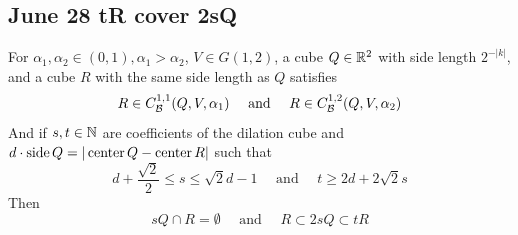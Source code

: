 \subsection{June 28 tR cover 2sQ}
\begin{lemma}
    For $\alpha_1, \alpha_2\in(0,1), \alpha_1>\alpha_2$, $V\in G(1,2)$, a cube $Q\in \mathbb{R}^2$ with side length $2^{-|k|}$, and a cube $R$ with the same side length as $Q$ satisfies
    \begin{equation}\label{eq:condition-GDBC-2}
        R\in C_\mathcal B^{1,1}(Q, V, \alpha_1) \quad\text{ and }\quad R\in  C_\mathcal B^{1,2}(Q, V, \alpha_2)
    \end{equation}
    And if $s, t\in \mathbb{N}$ are coefficients of the dilation cube and $d\cdot\operatorname{side} Q=|\operatorname{center} Q-\operatorname{center} R|$ such that 
    \begin{equation}\label{eq:tRcover2sQ-cond}
        d+\frac{\sqrt{2}}{2}\leq s \leq \sqrt{2}d-1 \quad\text{ and }\quad t \geq 2d + 2\sqrt{2}s
    \end{equation} 
    Then 
    \begin{equation}\label{eq:tRcover2sQ-conclusion}
        sQ\cap R = \emptyset \quad\text{ and }\quad R\subset 2sQ\subset tR
    \end{equation}
\end{lemma}
